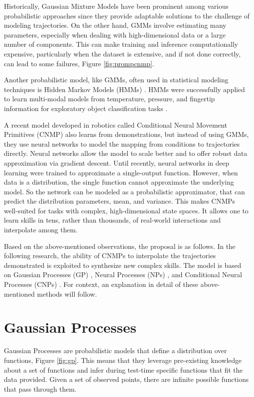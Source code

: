 Historically, Gaussian Mixture Models \cite{nguyen2009model} have been prominent among various probabilistic approaches since they provide adaptable solutions to the challenge of modeling trajectories. On the other hand, GMMs involve estimating many parameters, especially when dealing with high-dimensional data or a large number of components. This can make training and inference computationally expensive, particularly when the dataset is extensive, and if not done correctly, can lead to some failures, Figure \ref{fig:prompcnmp}.

Another probabilistic model, like GMMs, often used in statistical modeling techniques is Hidden Markov Models (HMMs) \cite{lee2011incremental}. HMMs were successfully applied to learn multi-modal models from temperature, pressure, and fingertip information for exploratory object classification tasks \cite{chu2013using}.

A recent model developed in robotics called Conditional Neural Movement Primitives (CNMP) \cite{Ugur-RSS-19} also learns from demonstrations, but instead of using GMMs, they use neural networks to model the mapping from conditions to trajectories directly. Neural networks allow the model to scale better and to offer robust data approximation via gradient descent. Until recently, neural networks in deep learning were trained to approximate a single-output function. However, when data is a distribution, the single function cannot approximate the underlying model. So the network can be modeled as a probabilistic approximator, that can predict the distribution parameters, mean, and variance. This makes CNMPs well-suited for tasks with complex, high-dimensional state spaces. It allows one to learn skills in tens, rather than thousands, of real-world interactions and interpolate among them.

Based on the above-mentioned observations, the proposal is as follows.
In the following research, the ability of CNMPs to interpolate the trajectories demonstrated is exploited to synthesize new complex skills. 
The model is based on Gaussian Processes (GP) \cite{seeger2004gaussian}, Neural Processes (NPs) \cite{garnelo2018neural}, and  Conditional Neural Processes (CNPs) \cite{DBLP:journals/corr/abs-1807-01613}.
For context, an explanation in detail of these above-mentioned methods will follow.


\newpage
\section{Gaussian Processes}
Gaussian Processes \cite{seeger2004gaussian} are probabilistic models that define a distribution over functions, Figure \ref{fig:gp}.
This means that they leverage pre-existing knowledge about a set of functions and infer during test-time specific functions that fit the data provided. Given a set of observed points, there are infinite possible functions that pass through them. 


